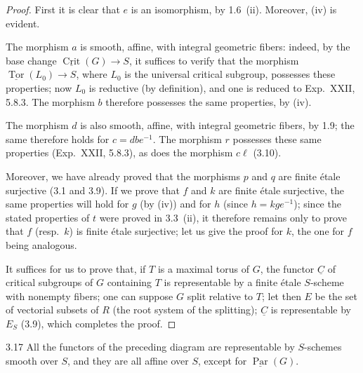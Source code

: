 \begin{proof}
First it is clear that $e$ is an isomorphism, by 1.6~(ii). Moreover, (iv) is evident.

The morphism $a$ is smooth, affine, with integral geometric fibers: indeed, by the base change $\underline{\operatorname{Crit}}(G)\to S$, it suffices to verify that the morphism $\underline{\operatorname{Tor}}(L_0)\to S$, where $L_0$ is the universal critical subgroup, possesses these properties; now $L_0$ is reductive (by definition), and one is reduced to Exp.~XXII, 5.8.3. The morphism $b$ therefore possesses the same properties, by (iv).

The morphism $d$ is also smooth, affine, with integral geometric fibers, by 1.9; the same therefore holds for $c=dbe^{-1}$. The morphism $r$ possesses these same properties (Exp.~XXII, 5.8.3), as does the morphism $c\ell$ (3.10).

Moreover, we have already proved that the morphisms $p$ and $q$ are finite \'etale surjective (3.1 and 3.9). If we prove that $f$ and $k$ are finite \'etale surjective, the same properties will hold for $g$ (by (iv)) and for $h$ (since $h=kge^{-1}$); since the stated properties of $t$ were proved in 3.3~(ii), it therefore remains only to prove that $f$ (resp.~$k$) is finite \'etale surjective; let us give the proof for $k$, the one for $f$ being analogous.

It suffices for us to prove that, if $T$ is a maximal torus of $G$, the functor $\underline C$ of critical subgroups of $G$ containing $T$ is representable by a finite \'etale $S$-scheme with nonempty fibers; one can suppose $G$ split relative to $T$; let then $E$ be the set of vectorial subsets of $R$ (the root system of the splitting); $\underline C$ is representable by $E_S$ (3.9), which completes the proof.
\end{proof}
\begin{corollary}{3.17}\label{XXVI.3.17}
All the functors of the preceding diagram are representable by $S$-schemes smooth over $S$, and they are all affine over $S$, except for $\underline{\operatorname{Par}}(G)$.
\end{corollary}
